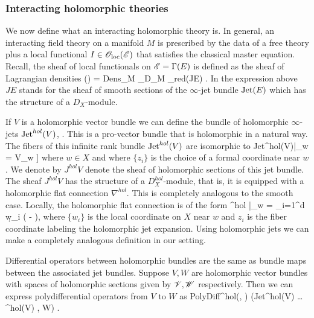 \subsubsection{Interacting holomorphic theories}

\def\olochol{\sO_{\rm loc}^{hol}}

We now define what an interacting holomorphic theory is.
In general, an interacting field theory on a manifold $M$ is prescribed by the data of a free theory plus a local functional $I \in {\mathscr O}_{\rm loc}(\mathscr E)$ that satisfies the classical master equation. 
Recall, the sheaf of local functionals on $\mathscr E = \Gamma(E)$ is defined as the sheaf of Lagrangian densities
\ben
\oloc(\sE) = {\rm Dens}_M \tensor_{D_M} \sO_{red}(JE) .
\een
In the expression above $JE$ stands for the sheaf of smooth sections of the $\infty$-jet bundle ${\rm Jet}(E)$ which has the structure of a $D_X$-module.

If $V$ is a holomorphic vector bundle we can define the bundle of holomorphic $\infty$-jets ${\rm Jet}^{hol}(V)$, \cite{GriffithsGreen, Wong}. 
This is a pro-vector bundle that is holomorphic in a natural way.
The fibers of this infinite rank bundle ${\rm Jet}^{hol}(V)$ are isomorphic to 
\ben
{\rm Jet}^{hol}(V)|_w = V_w \tensor \CC[[z_1,\ldots,z_d]] 
\een
where $w \in X$ and where $\{z_i\}$ is the choice of a formal coordinate near $w$. 
We denote by $J^{hol} V$ denote the sheaf of holomorphic sections of this jet bundle.
The sheaf $J^{hol}V$ has the structure of a $D_X^{hol}$-module, that is, it is equipped with a holomorphic flat connection $\nabla^{hol}$.
This is completely analogous to the smooth case.
Locally, the holomorphic flat connection is of the form
\ben
\nabla^{hol} |_w = \sum_{i=1}^d \d w_i \left( - \right),
\een
where $\{w_i\}$ is the local coordinate on $X$ near $w$ and $z_i$ is the fiber coordinate labeling the holomorphic jet expansion.
Using holomorphic jets we can make a completely analogous definition in our setting.

Differential operators between holomorphic bundles are the same as bundle maps between the associated jet bundles. 
Suppose $V,W$ are holomorphic vector bundles with spaces of holomorphic sections given by $\mathscr V,\mathscr W$ respectively.
Then we can express polydifferential operators from $V$ to $W$ as
\ben
{\rm PolyDiff}^{hol}(\sV \times \cdots \times \sV, \sW) ({\rm Jet}^{\rm hol}(V) \tensor \ldots {}^{\rm hol}(V) , W) .
\een

